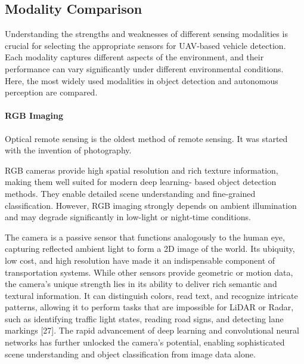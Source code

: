 \documentclass[12pt,oneside,bibtotoc,liststotoc]{scrbook}
\begin{document}
\subsection{Modality Comparison}

Understanding the strengths and weaknesses of different sensing 
modalities is crucial for selecting the appropriate sensors for 
UAV-based vehicle detection. Each modality captures different 
aspects of the environment, and their performance can vary 
significantly under different environmental conditions. Here,
the most widely used modalities in object detection and 
autonomous perception are compared.


\paragraph{RGB Imaging}

Optical remote sensing is the oldest method of remote sensing.
It was started with the invention of photography. 
\cite{agrawal2019comparativeRemoteSensing}

RGB cameras provide high spatial resolution and rich texture
information, making them well suited for modern deep learning-
based object detection methods. They enable detailed scene
understanding and fine-grained classification. However, RGB
imaging strongly depends on ambient illumination and may
degrade significantly in low-light or night-time conditions.

The camera is a passive sensor that functions analogously
to the human eye, capturing reflected ambient light to form
a 2D image of the world. Its ubiquity, low cost, and high
resolution have made it an indispensable component of
transportation systems. While other sensors provide
geometric or motion data, the camera's unique strength lies
in its ability to deliver rich semantic and textural
information. It can distinguish colors, read text, and
recognize intricate patterns, allowing it to perform tasks that
are impossible for LiDAR or Radar, such as identifying
traffic light states, reading road signs, and detecting lane
markings [27]. The rapid advancement of deep learning and
convolutional neural networks has further unlocked the
camera's potential, enabling sophisticated scene
understanding and object classification from image data
alone.
\cite{soltanirad2025autonomousTransportationPerception}
\end{document}
